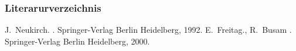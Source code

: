 \begin{frame}
    \frametitle{Literarurverzeichnis}

    \begin{thebibliography}{Freitag und Busam, 2000}
            J.~Neukirch.
            .
            \newblock Springer-Verlag Berlin Heidelberg, 1992.
            E.~Freitag., R.~Busam
            .
            \newblock Springer-Verlag Berlin Heidelberg, 2000.
    \end{thebibliography}

\end{frame}